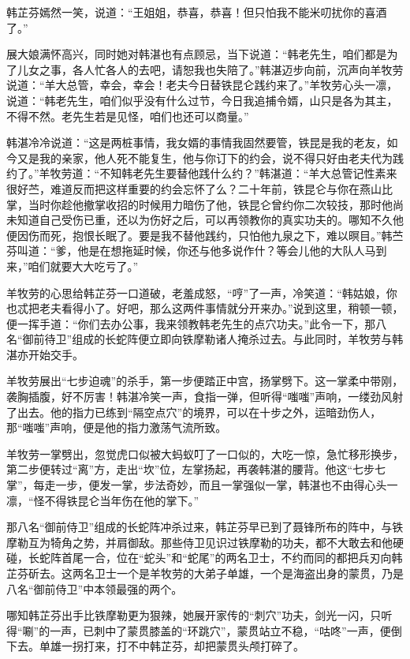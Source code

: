 \documentclass[12pt,oneside]{book}
\begin{document}
韩芷芬嫣然一笑，说道：``王姐姐，恭喜，恭喜！但只怕我不能米叨扰你的喜酒了。''

展大娘满怀高兴，同时她对韩湛也有点顾忌，当下说道：``韩老先生，咱们都是为了儿女之事，各人忙各人的去吧，请恕我也失陪了。''韩湛迈步向前，沉声向羊牧劳说道：``羊大总管，幸会，幸会！老夫今日替铁昆仑践约来了。''羊牧劳心头一凛，说道：``韩老先生，咱们似乎没有什么过节，今日我追捕令婿，山只是各为其主，不得不然。老先生若是见怪，咱们也还可以商量。''

韩湛冷冷说道：``这是两桩事情，我女婿的事情我固然要管，铁昆是我的老友，如今又是我的亲家，他人死不能复生，他与你订下的约会，说不得只好由老夫代为践约了。''羊牧劳道：``不知韩老先生要替他践什么约？''韩湛道：``羊大总管记性素来很好苎，难道反而把这样重要的约会忘怀了么？二十年前，铁昆仑与你在燕山比掌，当时你趁他撤掌收招的时候用力暗伤了他，铁昆仑曾约你二次较技，那时他尚未知道自己受伤已重，还以为伤好之后，可以再领教你的真实功夫的。哪知不久他便因伤而死，抱恨长眠了。要是我不替他践约，只怕他九泉之下，难以暝目。''韩苎芬叫道：``爹，他是在想拖延时候，你还与他多说作什？等会儿他的大队人马到来，''咱们就要大大吃亏了。''

羊牧劳的心思给韩芷芬一口道破，老羞成怒，``哼''了一声，冷笑道：``韩姑娘，你也忒把老夫看得小了。好吧，那么这两件事情就分开来办。''说到这里，稍顿一顿，便一挥手道：``你们去办公事，我来领教韩老先生的点穴功夫。''此令一下，那八名``御前待卫''组成的长蛇阵便立即向铁摩勒诸人掩杀过去。与此同时，羊牧劳与韩湛亦开始交手。

羊牧劳展出``七步迫魂''的杀手，第一步便踏正中宫，扬掌劈下。这一掌柔中带刚，袭胸插腹，好不厉害！韩湛冷笑一声，食指一弹，但听得``嗤嗤''声响，一缕劲风射了出去。他的指力已练到``隔空点穴''的境界，可以在十步之外，运暗劲伤人，那``嗤嗤''声响，便是他的指力激荡气流所致。

羊牧劳一掌劈出，忽觉虎口似被大蚂蚁叮了一口似的，大吃一惊，急忙移形换步，第二步便转过``离''方，走出``坎''位，左掌扬起，再袭韩湛的腰背。他这``七步七掌''，每走一步，便发一掌，步法奇妙，而且一掌强似一掌，韩湛也不由得心头一凛，``怪不得铁昆仑当年伤在他的掌下。''

那八名``御前侍卫''组成的长蛇阵冲杀过来，韩芷芬早已到了聂锋所布的阵中，与铁摩勒互为犄角之势，并肩御敌。那些侍卫见识过铁摩勒的功夫，都不大敢去和他硬碰，长蛇阵首尾一合，位在``蛇头''和``蛇尾''的两名卫士，不约而同的都把兵刃向韩芷芬斫去。这两名卫士一个是羊牧劳的大弟子单雄，一个是海盗出身的蒙贯，乃是八名``御前侍卫''中本领最强的两个。

哪知韩芷芬出手比铁摩勒更为狠辣，她展开家传的``刺穴''功夫，剑光一闪，只听得``唰''的一声，已刺中了蒙贯膝盖的``环跳穴''，蒙贯站立不稳，``咕咚''一声，便倒下去。单雄一拐打来，打不中韩芷芬，却把蒙贯头颅打碎了。
\end{document}

